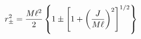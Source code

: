 \begin{equation}
r_{\pm}^2 = {{M\ell^2} \over 2} \left \{ 1 \pm \left [
   1 + \left ( {J \over M\ell} \right )^2 \right ]^{1/2} \right \}
\label{horizon}
\end{equation}

